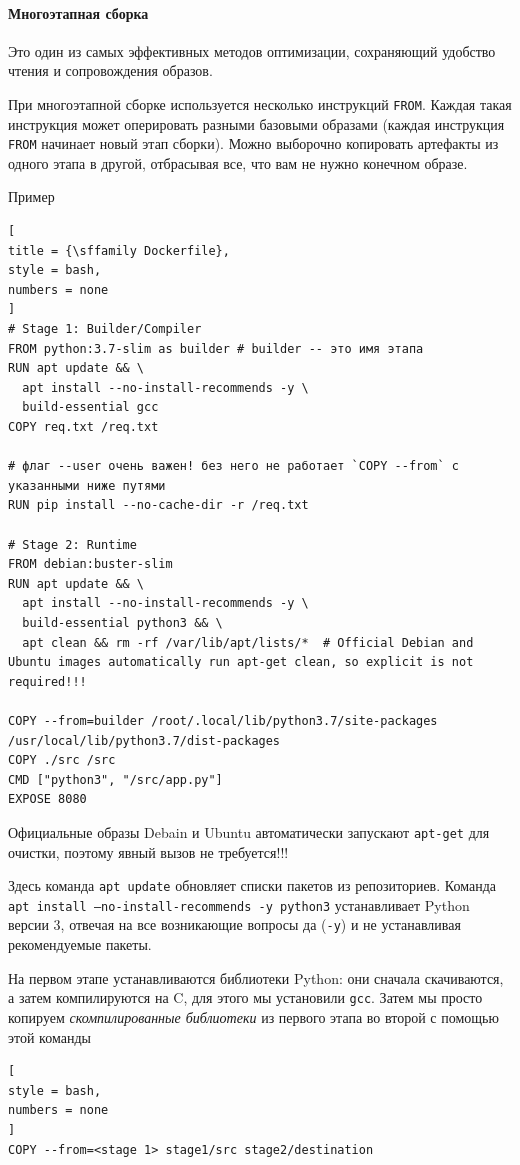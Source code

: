 \documentclass[%
	11pt,
	a4paper,
	utf8,
		]{article}
\begin{document}
\paragraph{Многоэтапная сборка} Это один из самых эффективных методов оптимизации, сохраняющий удобство чтения и сопровождения образов.

При многоэтапной сборке используется несколько инструкций \texttt{FROM}. Каждая такая инструкция может оперировать разными базовыми образами (каждая инструкция \texttt{FROM} начинает новый этап сборки). Можно выборочно копировать артефакты из одного этапа в другой, отбрасывая все, что вам не нужно конечном образе.

Пример
\begin{lstlisting}[
title = {\sffamily Dockerfile},
style = bash,
numbers = none	
]
# Stage 1: Builder/Compiler
FROM python:3.7-slim as builder # builder -- это имя этапа
RUN apt update && \
  apt install --no-install-recommends -y \
  build-essential gcc
COPY req.txt /req.txt

# флаг --user очень важен! без него не работает `COPY --from` с указанными ниже путями
RUN pip install --no-cache-dir -r /req.txt

# Stage 2: Runtime
FROM debian:buster-slim
RUN apt update && \
  apt install --no-install-recommends -y \
  build-essential python3 && \
  apt clean && rm -rf /var/lib/apt/lists/*  # Official Debian and Ubuntu images automatically run apt-get clean, so explicit is not required!!!
  
COPY --from=builder /root/.local/lib/python3.7/site-packages /usr/local/lib/python3.7/dist-packages
COPY ./src /src
CMD ["python3", "/src/app.py"]
EXPOSE 8080
\end{lstlisting}

{\color{red} Официальные образы Debain и Ubuntu автоматически запускают \verb|apt-get| для очистки, поэтому явный вызов не требуется!!!}

Здесь команда \texttt{apt update} обновляет списки пакетов из репозиториев. Команда \texttt{apt install --no-install-recommends -y python3} устанавливает Python версии 3, отвечая на все возникающие вопросы да (\verb|-y|) и не устанавливая рекомендуемые пакеты.

На первом этапе устанавливаются библиотеки Python: они сначала скачиваются, а затем компилируются на C, для этого мы установили \texttt{gcc}. Затем мы просто копируем \emph{скомпилированные библиотеки} из первого этапа во второй с помощью этой команды
\begin{lstlisting}[
style = bash,
numbers = none	
]
COPY --from=<stage 1> stage1/src stage2/destination
\end{lstlisting}
\end{document}
